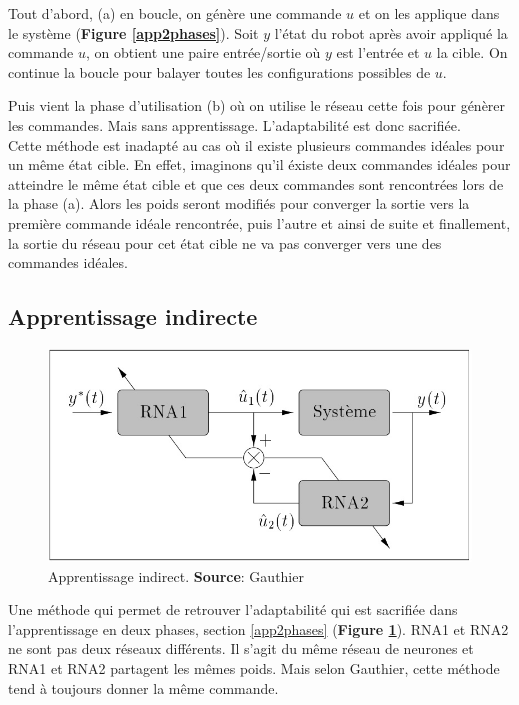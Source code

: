 Tout d'abord, (a) en boucle, on génère une commande $u$ et on les applique dans le système (\textbf{Figure \ref{app2phases}}).
Soit $y$ l'état du robot après avoir appliqué la commande $u$, on obtient une paire entrée/sortie où $y$ est l'entrée et $u$ la cible.
On continue la boucle pour balayer toutes les configurations possibles de $u$.

Puis vient la phase d'utilisation (b) où on utilise le réseau cette fois pour génèrer les commandes. Mais sans apprentissage. L'adaptabilité est donc sacrifiée.\\

Cette méthode est inadapté au cas où il existe plusieurs commandes idéales pour un même état cible.
En effet, imaginons qu'il éxiste deux commandes idéales pour atteindre le même état cible et que ces deux commandes sont rencontrées lors de la phase (a).
Alors les poids seront modifiés pour converger la sortie vers la première commande idéale rencontrée, puis l'autre et ainsi de suite et finallement, la sortie du réseau pour cet état cible ne va pas converger vers une des commandes idéales.

\subsection{Apprentissage indirecte}
\begin{figure}
 \centering
 \includegraphics[scale=0.5]{../figures/appindirect.jpg}
 \caption{Apprentissage indirect. \textbf{Source}: Gauthier\cite{Gauthier}}
 \label{appindirect}
\end{figure}

Une méthode qui permet de retrouver l'adaptabilité qui est sacrifiée dans l'apprentissage en deux phases, section \ref{app2phases} (\textbf{Figure \ref{appindirect}}).
RNA1 et RNA2 ne sont pas deux réseaux différents. Il s'agit du même réseau de neurones et RNA1 et RNA2 partagent les mêmes poids.
Mais selon Gauthier\cite{Gauthier}, cette méthode tend à toujours donner la même commande.

